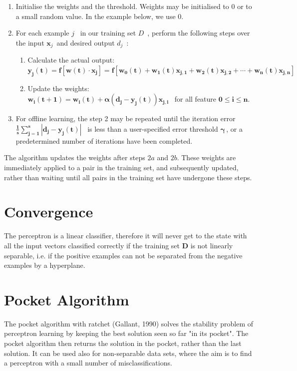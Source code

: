\begin{enumerate}

\item Initialise the weights and the threshold. Weights may be initialised to $0$ or to a small random value. In the example below, we use $0$.

\item  For each example $j$ \, in our training set $D$ \,, perform the following steps over the input $\mathbf{x}_j$\, and desired output $d_j$ \,:

\begin{enumerate}
\item Calculate the actual output: \hfill \\
$\mathbf{y_j(t) = f[\mathbf{w}(t)\cdot\mathbf{x}_j] = f[w_0(t) + w_1(t)x_{j,1} + w_2(t)x_{j,2} + \dotsb + w_n(t)x_{j,n}]}$
\item Update the weights: \hfill \\
$\mathbf{w_i(t+1) = w_i(t) + \alpha (d_j - y_j(t)) x_{j,i}}$ \, for all feature $\mathbf{0 \leq i \leq n}$.
\end{enumerate}

\item  For offline learning, the step 2 may be repeated until the iteration error 
$\mathbf{\frac{1}{s} \sum_{j=1}^s |d_j - y_j(t)|}$ \, is less than a user-specified error threshold $\mathbf{\gamma}$\,, or a predetermined number of iterations have been completed.

\end{enumerate}

The algorithm updates the weights after steps $2a$ and $2b$. These weights are immediately applied to a pair in the training set, and subsequently updated, rather than waiting until all pairs in the training set have undergone these steps.

\section{Convergence}
The perceptron is a linear classifier, therefore it will never get to the state with all the input vectors classified correctly if the training set $\mathbf{D}$ is not linearly separable, i.e. if the positive examples can not be separated from the negative examples by a hyperplane.

\section{Pocket Algorithm}
The pocket algorithm with ratchet (Gallant, 1990) solves the stability problem of perceptron learning by keeping the best solution seen so far "in its pocket". The pocket algorithm then returns the solution in the pocket, rather than the last solution. It can be used also for non-separable data sets, where the aim is to find a perceptron with a small number of misclassifications.



